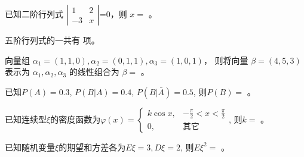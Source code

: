 \documentclass{jnuexam}
\begin{document}
\renewcommand{\niandu}{2018--2019}
\renewcommand{\xueqi}{1}
\renewcommand{\kecheng}{合同法}
\renewcommand{\zhuanye}{法学} %
\renewcommand{\jiaoshi}{XXX} %
\renewcommand{\shijian}{2019~年~01~月~28~日}
\renewcommand{\bixiu}{1} %
\renewcommand{\bijuan}{1} %
\renewcommand{\shijuan}{A} %
\renewcommand{\neizhao}{1} %
\renewcommand{\waizhao}{0} %

\makehead %


\newpageb %

\begin{problem}
已知二阶行列式 $\text{$\left|\begin{array}{cc}
  1 & 2\\
  - 3 & x
\end{array}\right|$=0}$，则 $x=$ 。
\end{problem}

\vfill

\begin{problem}
五阶行列式的一共有  项。
\end{problem}

\vfill

\begin{problem}
向量组 $\alpha_1=(1,1,0), \alpha_2=(0,1,1), \alpha_3=(1,0,1)$，
则将向量 $\beta=(4, 5, 3)$ 表示为 $\alpha_1, \alpha_2, \alpha_3$
的线性组合为 $\beta=$ 。
\end{problem}

\vfill

\begin{problem}
已知$P(A)=0.3$, $P(B|A)=0.4$, $P(B|\bar{A})=0.5$, 则$P(B)=$ 。
\end{problem}

\vfill

\begin{problem}
已知连续型$\xi$的密度函数为$\varphi(x)=\left\{
\begin{array}{ll}
  k \cos x, & - \frac{\pi}{2} < x < \frac{\pi}{2}\\
  0, & \text{其它}
\end{array}\right.$,
则$k=$ 。
\end{problem}

\vfill

\begin{problem}
已知随机变量$\xi$的期望和方差各为$E\xi=3, D\xi=2$, 则$E\xi^2=$ 。
\end{problem}
\end{document}
